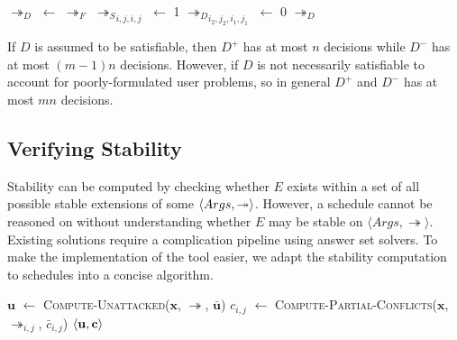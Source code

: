 \begin{algorithm}[H]
	\caption{}
	\begin{algorithmic}[1]
			\State $\twoheadrightarrow_D$ $\gets$ $\twoheadrightarrow_F$
				\State ${\twoheadrightarrow_S}_{i,j,i,j}$ $\gets$ 1
			\EndFor
					\State ${\twoheadrightarrow_D}_{i_2,j_2,i_1,j_1}$ $\gets$ 0				
				\EndFor
			\EndFor
			\State \Return $\twoheadrightarrow_D$
		\EndFunction
	\end{algorithmic}
\end{algorithm}

If $D$ is assumed to be satisfiable, then $D^+$ has at most $n$ decisions while $D^-$ has at most $(m-1)n$ decisions. However, if $D$ is not necessarily satisfiable to account for poorly-formulated user problems, so in general $D^+$ and $D^-$ has at most $mn$ decisions.

\subsection{Verifying Stability}
\label{verifyingstability}

Stability can be computed by checking whether $E$ exists within a set of all possible stable extensions of some $\langle{Args},{\twoheadrightarrow}\rangle$. However, a schedule cannot be reasoned on without understanding whether $E$ may be stable on $\langle Args, \twoheadrightarrow\rangle$. Existing solutions require a complication pipeline using answer set solvers. To make the implementation of the tool easier, we adapt the stability computation to schedules into a concise algorithm.

\begin{algorithm}[H]
	\caption{}
	\begin{algorithmic}[1]
			\State $\mathbf{u}$ $\gets$ \textsc{Compute-Unattacked}($\mathbf{x}$, $\twoheadrightarrow$, $\bar{\mathbf{u}}$)
				\State $c_{i,j}$ $\gets$ \textsc{Compute-Partial-Conflicts}($\mathbf{x}$, $\twoheadrightarrow_{i,j}$, $\bar{c}_{i,j}$)
			\EndFor			
			\State \Return $\langle{\mathbf{u}},{\mathbf{c}}\rangle$
		\EndFunction
	\end{algorithmic}
\end{algorithm}


